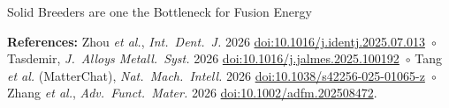 \documentclass[aspectratio=169, 11pt]{beamer}
\begin{document}
\begin{frame}{Solid Breeders are one the Bottleneck for Fusion Energy}
\vfill
{\scriptsize\color{ornlgrey}
\textbf{References:}\;
\tiny
Zhou \emph{et al.}, \emph{Int.\ Dent.\ J.} 2026 \href{https://doi.org/10.1016/j.identj.2025.07.013}{doi:10.1016/j.identj.2025.07.013}~$\circ$
Tasdemir, \emph{J.\ Alloys Metall.\ Syst.} 2026 \href{https://doi.org/10.1016/j.jalmes.2025.100192}{doi:10.1016/j.jalmes.2025.100192}~$\circ$
Tang \emph{et al.} (MatterChat), \emph{Nat.\ Mach.\ Intell.} 2026 \href{https://doi.org/10.1038/s42256-025-01065-z}{doi:10.1038/s42256-025-01065-z}~$\circ$
Zhang \emph{et al.}, \emph{Adv.\ Funct.\ Mater.} 2026 \href{https://doi.org/10.1002/adfm.202508472}{doi:10.1002/adfm.202508472}.\par}
\end{frame}
\end{document}
